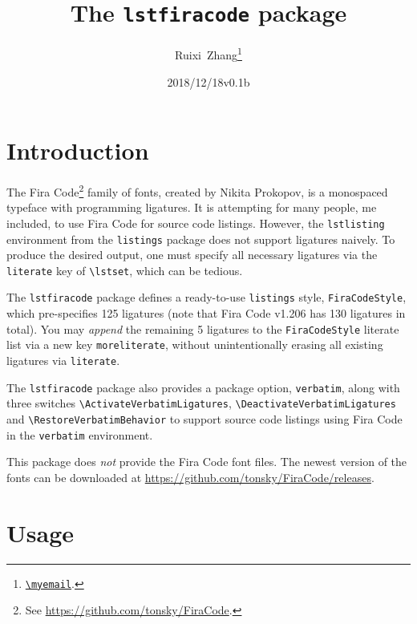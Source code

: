 \documentclass[11pt]{article}
\title{The \texttt{lstfiracode} package}
\author{Ruixi~Zhang\thanks{\href{mailto:\myemail}{\nolinkurl{\myemail}}.}}
\date{2018/12/18\enskip v0.1b}
\begin{document}
\maketitle

\tableofcontents
{}

\section{Introduction}

The Fira Code\footnote{See \url{https://github.com/tonsky/FiraCode}.} family
of fonts, created by Nikita Prokopov, is a monospaced typeface with
programming ligatures.
It is attempting for many people, me included, to use Fira Code for source
code listings.
However, the \verb|lstlisting| environment from the \verb|listings| package
does not support ligatures naively. To produce the desired output, one must
specify all necessary ligatures via the \verb|literate| key
of \verb|\lstset|, which can be tedious.

The \verb|lstfiracode| package defines a ready-to-use \verb|listings| style,
\verb|FiraCodeStyle|, which pre-specifies 125 ligatures
(note that Fira Code v1.206 has 130 ligatures in total).
You may \emph{append} the remaining 5 ligatures to the \verb|FiraCodeStyle|
literate list via a new key \verb|moreliterate|, without unintentionally
erasing all existing ligatures via \verb|literate|.

The \verb|lstfiracode| package also provides a package option,
\verb|verbatim|, along with three switches
\verb|\ActivateVerbatimLigatures|, \verb|\DeactivateVerbatimLigatures|
and \verb|\RestoreVerbatimBehavior|
to support source code listings using Fira Code
in the \verb|verbatim| environment.

This package does \emph{not} provide the Fira Code font files.
The newest version of the fonts can be downloaded at
\url{https://github.com/tonsky/FiraCode/releases}.

\section{Usage}
\end{document}
